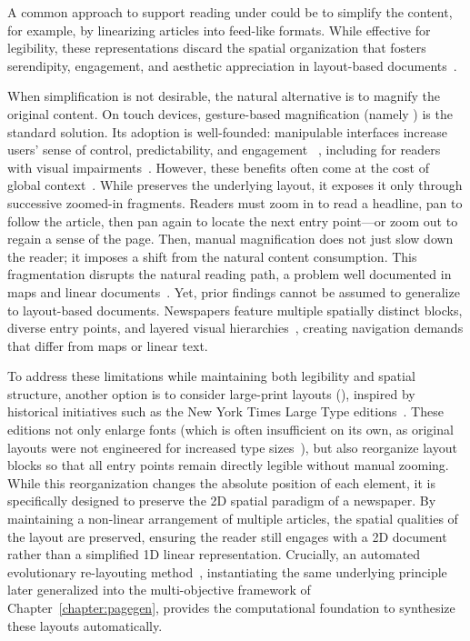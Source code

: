 A common approach to support reading under \CVAS could be to simplify the content, for example, by linearizing articles into feed-like formats. While effective for legibility, these representations discard the spatial organization that fosters serendipity, engagement, and aesthetic appreciation in layout-based documents~\cite{ozretic_dosen_key_2018, hollander_e-reader_2011}.

When simplification is not desirable, the natural alternative is to magnify the original content. On touch devices, gesture-based magnification (namely \panzoom) is the standard solution. Its adoption is well-founded: manipulable interfaces increase users' sense of control, predictability, and engagement   ~\cite{aljoudi, shneiderman_direct_1983, atata_evaluating_2025, priyadarshini_impact_2024}, including for readers with visual impairments~\cite{granquist_how_2018}. However, these benefits often come at the cost of global context~\cite{nav-patterns-2002, buring_zoomable}. While \panzoom preserves the underlying layout, it exposes it only through successive zoomed-in fragments. Readers must zoom in to read a headline, pan to follow the article, then pan again to locate the next entry point---or zoom out to regain a sense of the page. Then, manual magnification does not just slow down the reader; it imposes a shift from the natural content consumption. This fragmentation disrupts the natural reading path, a problem well documented in maps and linear documents~\cite{bowers-reading, tang_screen_2023, magnification-low-vision, nav-patterns-2002}. Yet, prior findings  cannot be assumed to generalize to layout-based documents. Newspapers feature multiple spatially distinct blocks, diverse entry points, and layered visual hierarchies~\cite{ozretic_dosen_key_2018}, creating navigation demands that differ from maps or linear text.



To address these limitations while maintaining both legibility and spatial structure, another option is to consider large-print layouts (\condtwo), inspired by historical initiatives such as the New York Times Large Type editions~\cite{nyt-large-type-1967}. These editions not only enlarge fonts (which is often insufficient on its own, as original layouts were not engineered for increased type sizes~), but also reorganize layout blocks so that all entry points remain directly legible without manual zooming. While this reorganization changes the absolute position of each element, it is specifically designed to preserve the 2D spatial paradigm of a newspaper. By maintaining a non-linear arrangement of multiple articles, the spatial qualities of the layout are preserved, ensuring the reader still engages with a 2D document rather than a simplified 1D linear representation. 
Crucially, an automated evolutionary re-layouting method~, instantiating the same underlying principle later generalized into the multi-objective framework of Chapter~\ref{chapter:pagegen}, provides the computational foundation to synthesize these \condtwo layouts automatically.

